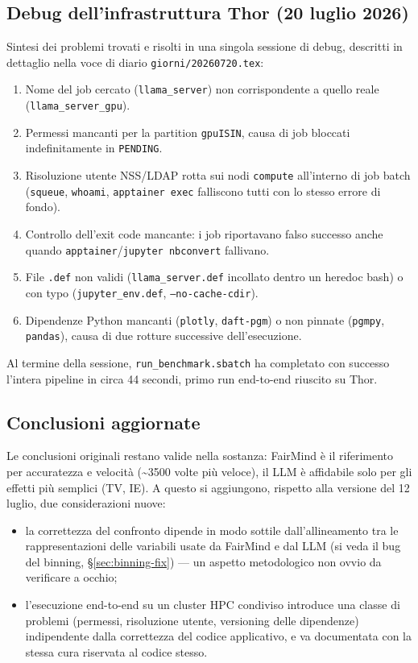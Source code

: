 \subsection{Debug dell'infrastruttura Thor (20 luglio 2026)}
\label{sec:debug-thor}

Sintesi dei problemi trovati e risolti in una singola sessione di debug, descritti in dettaglio nella voce di diario \texttt{giorni/20260720.tex}:
\begin{enumerate}
  \item Nome del job cercato (\texttt{llama\_server}) non corrispondente a quello reale (\texttt{llama\_server\_gpu}).
  \item Permessi mancanti per la partition \texttt{gpuISIN}, causa di job bloccati indefinitamente in \texttt{PENDING}.
  \item Risoluzione utente NSS/LDAP rotta sui nodi \texttt{compute} all'interno di job batch (\texttt{squeue}, \texttt{whoami}, \texttt{apptainer exec} falliscono tutti con lo stesso errore di fondo).
  \item Controllo dell'exit code mancante: i job riportavano falso successo anche quando \texttt{apptainer}/\texttt{jupyter nbconvert} fallivano.
  \item File \texttt{.def} non validi (\texttt{llama\_server.def} incollato dentro un heredoc bash) o con typo (\texttt{jupyter\_env.def}, \texttt{--no-cache-cdir}).
  \item Dipendenze Python mancanti (\texttt{plotly}, \texttt{daft-pgm}) o non pinnate (\texttt{pgmpy}, \texttt{pandas}), causa di due rotture successive dell'esecuzione.
\end{enumerate}
Al termine della sessione, \texttt{run\_benchmark.sbatch} ha completato con successo l'intera pipeline in circa 44 secondi, primo run end-to-end riuscito su Thor.

\subsection{Conclusioni aggiornate}

Le conclusioni originali restano valide nella sostanza: FairMind \`e il riferimento per accuratezza e velocit\`a (\textasciitilde 3500 volte pi\`u veloce), il LLM \`e affidabile solo per gli effetti pi\`u semplici (TV, IE). A questo si aggiungono, rispetto alla versione del 12 luglio, due considerazioni nuove:
\begin{itemize}
  \item la correttezza del confronto dipende in modo sottile dall'allineamento tra le rappresentazioni delle variabili usate da FairMind e dal LLM (si veda il bug del binning, \S\ref{sec:binning-fix}) --- un aspetto metodologico non ovvio da verificare a occhio;
  \item l'esecuzione end-to-end su un cluster HPC condiviso introduce una classe di problemi (permessi, risoluzione utente, versioning delle dipendenze) indipendente dalla correttezza del codice applicativo, e va documentata con la stessa cura riservata al codice stesso.
\end{itemize}
